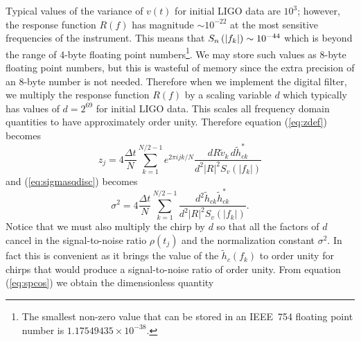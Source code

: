 Typical values of the variance of $v(t)$ for initial LIGO data are $10^3$;
however, the response function $R(f)$ has magnitude $\sim 10^{-22}$ at the most
sensitive frequencies of the instrument.  This means that $S_n\left(\left|f_{k}\right|\right) \sim
10^{-44}$ which is beyond the range of 4-byte floating point
numbers\footnote{The smallest non-zero value that can be stored in an IEEE~754
floating point number is $1.17549435\times 10^{-38}$.}. We may store such
values as 8-byte floating point numbers, but this is wasteful of memory since
the extra precision of an 8-byte number is not needed. Therefore when we
implement the digital filter, we multiply the response function $R(f)$ by a
scaling variable $d$ which typically has values of $d = 2^{69}$ for initial
LIGO data. This scales all frequency domain quantities to have approximately
order unity.  Therefore equation (\ref{eq:zdef}) becomes
\begin{equation}
\label{eq:zdefcal}
z_j = 4 \frac{\Delta t}{N} \sum_{k=1}^{N/2-1} e^{2\pi ijk/N} 
  \frac{dR\tilde{v}_k\, d\tilde{h}_{ck}^\ast}
  {d^2|R|^2S_v\left(\left|f_k\right|\right)}
\end{equation}
and (\ref{eq:sigmasqdisc}) becomes
\begin{equation}
\label{eq:sigmasqdisccal}
\sigma^2 = 4 \frac{\Delta t}{N} \sum_{k=1}^{N/2-1}
\frac{d^2 \tilde{h}_{ck}\tilde{h}_{ck}^\ast}
{d^2|R|^2S_v\left(\left|f_k\right|\right)}. 
\end{equation}
Notice that we must also multiply the chirp by $d$ so that all the factors of
$d$ cancel in the signal-to-noise ratio $\rho(t_j)$ and the normalization
constant $\sigma^2$. In fact this is convenient as it brings the value of
the $\tilde{h}_c(f_k)$ to order unity for chirps that would produce a
signal-to-noise ratio of order unity. From equation (\ref{eq:spcos}) we obtain
the dimensionless quantity
